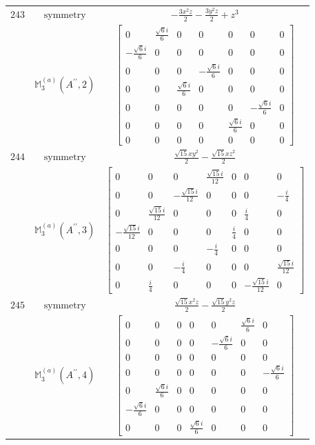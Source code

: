 \documentclass[fleqn,8pt,landscape]{jsarticle}
\begin{document}
\begin{longtable}{ccc}
$ 243 $ & $ \text{symmetry} $ & $ - \frac{3 x^{2} z}{2} - \frac{3 y^{2} z}{2} + z^{3} $ \\
$  $ & $ \mathbb{M}_{3}^{(a)}(A^{\prime\prime},2) $ & $ \begin{bmatrix} 0 & \frac{\sqrt{6} i}{6} & 0 & 0 & 0 & 0 & 0 \\ - \frac{\sqrt{6} i}{6} & 0 & 0 & 0 & 0 & 0 & 0 \\ 0 & 0 & 0 & - \frac{\sqrt{6} i}{6} & 0 & 0 & 0 \\ 0 & 0 & \frac{\sqrt{6} i}{6} & 0 & 0 & 0 & 0 \\ 0 & 0 & 0 & 0 & 0 & - \frac{\sqrt{6} i}{6} & 0 \\ 0 & 0 & 0 & 0 & \frac{\sqrt{6} i}{6} & 0 & 0 \\ 0 & 0 & 0 & 0 & 0 & 0 & 0 \end{bmatrix} $ \\ \hline
$ 244 $ & $ \text{symmetry} $ & $ \frac{\sqrt{15} x y^{2}}{2} - \frac{\sqrt{15} x z^{2}}{2} $ \\
$  $ & $ \mathbb{M}_{3}^{(a)}(A^{\prime\prime},3) $ & $ \begin{bmatrix} 0 & 0 & 0 & \frac{\sqrt{15} i}{12} & 0 & 0 & 0 \\ 0 & 0 & - \frac{\sqrt{15} i}{12} & 0 & 0 & 0 & - \frac{i}{4} \\ 0 & \frac{\sqrt{15} i}{12} & 0 & 0 & 0 & \frac{i}{4} & 0 \\ - \frac{\sqrt{15} i}{12} & 0 & 0 & 0 & \frac{i}{4} & 0 & 0 \\ 0 & 0 & 0 & - \frac{i}{4} & 0 & 0 & 0 \\ 0 & 0 & - \frac{i}{4} & 0 & 0 & 0 & \frac{\sqrt{15} i}{12} \\ 0 & \frac{i}{4} & 0 & 0 & 0 & - \frac{\sqrt{15} i}{12} & 0 \end{bmatrix} $ \\ \hline
$ 245 $ & $ \text{symmetry} $ & $ \frac{\sqrt{15} x^{2} z}{2} - \frac{\sqrt{15} y^{2} z}{2} $ \\
$  $ & $ \mathbb{M}_{3}^{(a)}(A^{\prime\prime},4) $ & $ \begin{bmatrix} 0 & 0 & 0 & 0 & 0 & \frac{\sqrt{6} i}{6} & 0 \\ 0 & 0 & 0 & 0 & - \frac{\sqrt{6} i}{6} & 0 & 0 \\ 0 & 0 & 0 & 0 & 0 & 0 & 0 \\ 0 & 0 & 0 & 0 & 0 & 0 & - \frac{\sqrt{6} i}{6} \\ 0 & \frac{\sqrt{6} i}{6} & 0 & 0 & 0 & 0 & 0 \\ - \frac{\sqrt{6} i}{6} & 0 & 0 & 0 & 0 & 0 & 0 \\ 0 & 0 & 0 & \frac{\sqrt{6} i}{6} & 0 & 0 & 0 \end{bmatrix} $ \\ \hline

\end{longtable}
\end{document}
